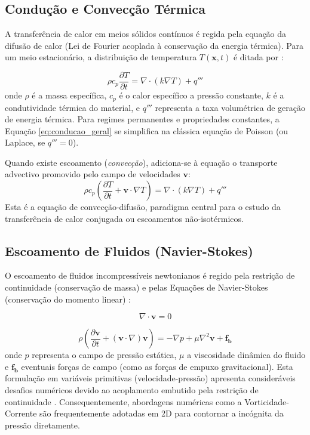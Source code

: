 \subsection{Condução e Convecção Térmica}

A transferência de calor em meios sólidos contínuos é regida pela equação da difusão de calor (Lei de Fourier acoplada à conservação da energia térmica). Para um meio estacionário, a distribuição de temperatura $T(\mathbf{x}, t)$ é ditada por \cite{Incropera2006}:

\begin{equation}
\rho c_p \frac{\partial T}{\partial t} = \nabla \cdot (k \nabla T) + q'''
\label{eq:conducao_geral}
\end{equation}
onde $\rho$ é a massa específica, $c_p$ é o calor específico a pressão constante, $k$ é a condutividade térmica do material, e $q'''$ representa a taxa volumétrica de geração de energia térmica. Para regimes permanentes e propriedades constantes, a Equação \ref{eq:conducao_geral} se simplifica na clássica equação de Poisson (ou Laplace, se $q''' = 0$).

Quando existe escoamento (\textit{convecção}), adiciona-se à equação o transporte advectivo promovido pelo campo de velocidades $\mathbf{v}$:
\begin{equation}
\rho c_p \left( \frac{\partial T}{\partial t} + \mathbf{v} \cdot \nabla T \right) = \nabla \cdot (k \nabla T) + q'''
\label{eq:conveccao_difusao}
\end{equation}
Esta é a equação de convecção-difusão, paradigma central para o estudo da transferência de calor conjugada ou escoamentos não-isotérmicos.

\subsection{Escoamento de Fluidos (Navier-Stokes)}

O escoamento de fluidos incompressíveis newtonianos é regido pela restrição de continuidade (conservação de massa) e pelas Equações de Navier-Stokes (conservação do momento linear) \cite{White2006}:

\begin{equation}
\nabla \cdot \mathbf{v} = 0
\label{eq:continuidade}
\end{equation}

\begin{equation}
\rho \left( \frac{\partial \mathbf{v}}{\partial t} + (\mathbf{v} \cdot \nabla) \mathbf{v} \right) = -\nabla p + \mu \nabla^2 \mathbf{v} + \mathbf{f_b}
\label{eq:navier_stokes_vel_pressao}
\end{equation}
onde $p$ representa o campo de pressão estática, $\mu$ a viscosidade dinâmica do fluido e $\mathbf{f_b}$ eventuais forças de campo (como as forças de empuxo gravitacional). Esta formulação em variáveis primitivas (velocidade-pressão) apresenta consideráveis desafios numéricos devido ao acoplamento embutido pela restrição de continuidade \cite{Maliska2004}. Consequentemente, abordagens numéricas como a Vorticidade-Corrente são frequentemente adotadas em 2D para contornar a incógnita da pressão diretamente.

